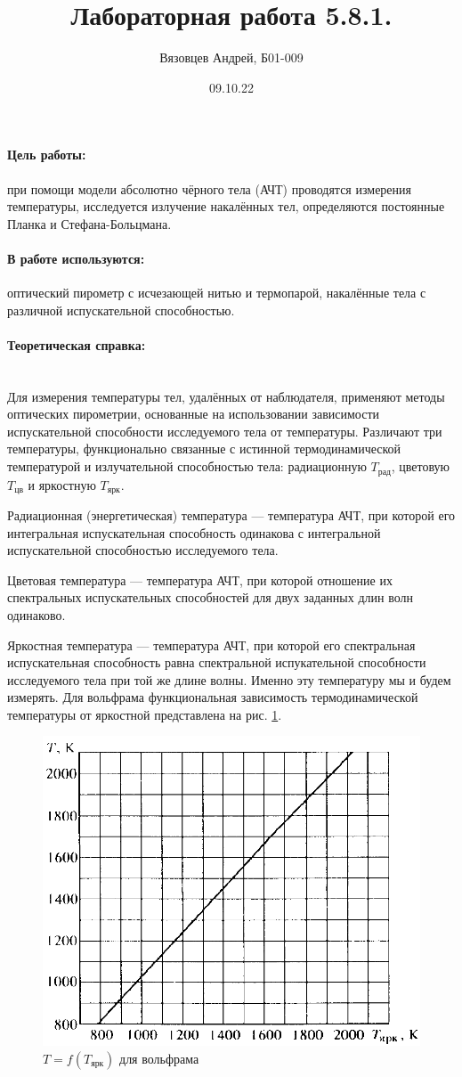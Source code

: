 \documentclass[a4paper, 12pt]{article}
\author{Вязовцев Андрей, Б01-009}
\date{09.10.22}
\title{Лабораторная работа 5.8.1. }
\newcommand{\parag}[1]{\paragraph*{#1:}}
\begin{document}
\maketitle

\parag {Цель работы} при помощи модели абсолютно чёрного тела (АЧТ) проводятся измерения температуры, исследуется излучение накалённых тел, определяются постоянные Планка и Стефана-Больцмана. 

\parag {В работе используются} оптический пирометр с исчезающей нитью и термопарой, накалённые тела с различной испускательной способностью.

\parag {Теоретическая справка} ~\\

Для измерения температуры тел, удалённых от наблюдателя, применяют методы оптических пирометрии, основанные на использовании зависимости испускательной способности исследуемого тела от температуры. Различают три температуры, функционально связанные с истинной термодинамической температурой и излучательной способностью тела: радиационную $T_{рад}$, цветовую $T_{цв}$ и яркостную $T_{ярк}$.

Радиационная (энергетическая) температура --- температура АЧТ, при которой его интегральная испускательная способность одинакова с интегральной испускательной способностью исследуемого тела.

Цветовая температура --- температура АЧТ, при которой отношение их спектральных испускательных способностей для двух заданных длин волн одинаково.

Яркостная температура --- температура АЧТ, при которой его спектральная испускательная способность равна спектральной испукательной способности исследуемого тела при той же длине волны. Именно эту температуру мы и будем измерять. Для вольфрама функциональная зависимость термодинамической температуры от яркостной представлена на рис. \ref{th:1}.

\begin{figure}[!h]
    \includegraphics[scale = 0.4]{Brightness}
    \centering
    \caption{$T = f(T_{ярк})$ для вольфрама}
    \label{th:1}
\end{figure}
\end{document}
